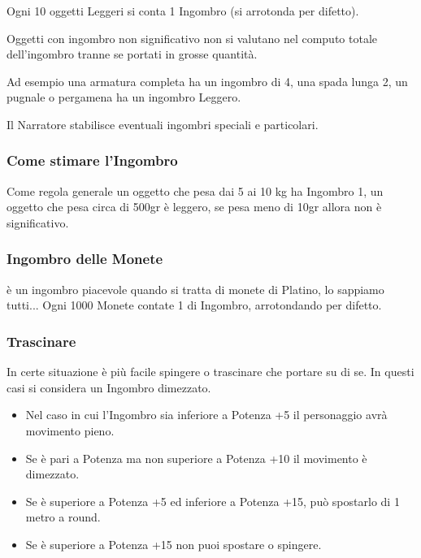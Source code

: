 \documentclass[a4paper,11pt,twoside,openany]{book}
\begin{document}
{Ogni 10 oggetti Leggeri si conta 1 Ingombro (si arrotonda per difetto).

Oggetti con ingombro non significativo non si valutano nel computo totale dell'ingombro tranne se portati in grosse quantità. 

Ad esempio una armatura completa ha un ingombro di 4, una spada lunga 2, un pugnale o pergamena ha un ingombro Leggero.

Il Narratore stabilisce eventuali ingombri speciali e particolari.

\subsubsection{Come stimare l'Ingombro}

Come regola generale un oggetto che pesa dai 5 ai 10 kg ha Ingombro 1, un oggetto che pesa circa di 500gr è leggero, se pesa meno di 10gr allora non è significativo.

\subsubsection{Ingombro delle Monete}

è un ingombro piacevole quando si tratta di monete di Platino, lo sappiamo tutti...
Ogni 1000 Monete contate 1 di Ingombro, arrotondando per difetto.


\subsubsection{Trascinare}

In certe situazione è più facile spingere o trascinare che portare su di se.
In questi casi si considera un Ingombro dimezzato.

\begin{itemize}
	\item Nel caso in cui l'Ingombro sia inferiore a Potenza +5 il personaggio avrà movimento pieno.

\item Se è pari a Potenza ma non superiore a Potenza +10 il movimento è dimezzato.

\item Se è superiore a Potenza +5 ed inferiore a Potenza +15, può spostarlo di 1 metro a round.

\item Se è superiore a Potenza +15 non puoi spostare o spingere.
\end{itemize}


}
\end{document}
